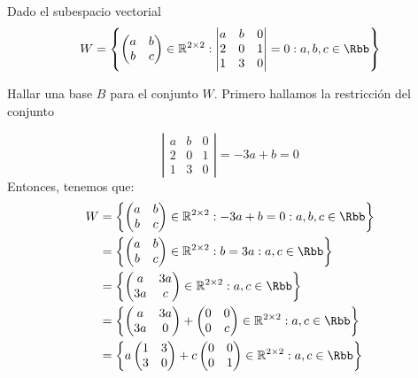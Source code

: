 \documentclass[compacto,10pt]{pubciencias-notas}
\begin{document}
\begin{ejem}
Dado el subespacio vectorial  
\[W=\left\lbrace \begin{pmatrix} a & b\\ b & c \end{pmatrix}\in \mathbb{R}^{2\times2}:
\left|    
     \begin{matrix}
     a & b & 0\\
     2 & 0 & 1 \\
     1 & 3 &0
     \end{matrix}
\right|=0: a,b,c\in\Rbb
\right\rbrace \]

    Hallar una base $B$ para el conjunto $W$.
Primero hallamos la restricción del conjunto

\[
\left|    
     \begin{matrix}
     a & b & 0\\
     2 & 0 & 1 \\
     1 & 3 &0
     \end{matrix}
\right|=-3a+b=0 
\]
Entonces, tenemos que:
\begin{align*}
W &=\left\lbrace \begin{pmatrix} a & b\\ b & c \end{pmatrix}\in \mathbb{R}^{2\times2}:
-3a+b=0: a,b,c\in\Rbb 
\right\rbrace\\
&=\left\lbrace \begin{pmatrix} a & b\\ b & c \end{pmatrix}\in \mathbb{R}^{2\times2}:
b=3a: a,c\in\Rbb 
\right\rbrace\\
&=\left\lbrace \begin{pmatrix} a & 3a\\ 3a & c \end{pmatrix}\in \mathbb{R}^{2\times2}: a,c\in\Rbb \right\rbrace\\
&=\left\lbrace \begin{pmatrix} a & 3a\\ 3a & 0 \end{pmatrix}+\begin{pmatrix} 0 & 0\\ 0 & c \end{pmatrix}\in \mathbb{R}^{2\times2}: a,c\in\Rbb \right\rbrace\\
&=\left\lbrace a\begin{pmatrix} 1 & 3\\ 3 & 0 \end{pmatrix}+c\begin{pmatrix} 0 & 0\\ 0 & 1 \end{pmatrix}\in \mathbb{R}^{2\times2}: a,c\in\Rbb \right\rbrace\\

\end{align*}
\end{ejem}
\end{document}
